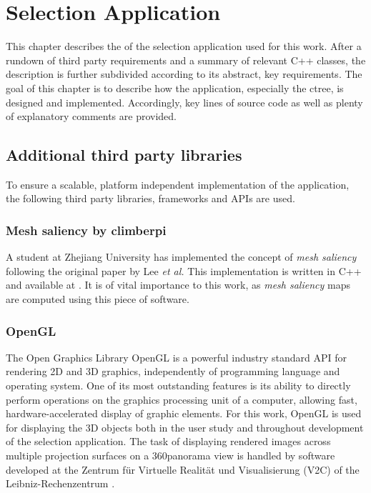 \chapter{Selection Application}
\label{sec:selection_application}

This chapter describes the of the selection application used for this work. After a rundown of third party requirements and a summary of relevant C++ classes, the description is further subdivided according to its abstract, key requirements.
The goal of this chapter is to describe how the application, especially the ctree\cite{Octree}, is designed and implemented. Accordingly, key lines of source code as well as plenty of explanatory comments are provided.

\section{Additional third party libraries}
\label{sec:additional_third_party_libraries}
To ensure a scalable, platform independent implementation of the application, the following third party libraries, frameworks and APIs are used.

\subsection{Mesh saliency by climberpi}
\label{sec:mesh_saliency_by_climberpi}
A student at Zhejiang University \cite{zju} has implemented the concept of \textit{mesh saliency} following the original paper by Lee \textit{et al.} This implementation is written in C++ and available at \cite{clms}. It is of vital importance to this work, as \textit{mesh saliency} maps are computed using this piece of software.

\subsection{OpenGL}
\label{sec:opengl}

The Open Graphics Library OpenGL \cite{OpenGL} is a powerful industry standard API for rendering 2D and 3D graphics, independently of programming language and operating system. One of its most outstanding features is its ability to directly perform operations on the graphics processing unit of a computer, allowing fast, hardware-accelerated display of graphic elements. For this work, OpenGL is used for displaying the 3D objects both in the user study and throughout development of the selection application. The task of displaying rendered images across multiple projection surfaces on a 360\degree panorama view is handled by software developed at the Zentrum f\"ur Virtuelle Realit\"at und Visualisierung (V2C) of the Leibniz-Rechenzentrum \cite{v2c}.

